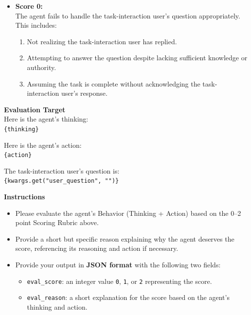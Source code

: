 \begin{promptbox}
\begin{itemize}
    \item \textbf{Score 0:} \\
    The agent fails to handle the task-interaction user's question appropriately. This includes:
    \begin{enumerate}
        \item Not realizing the task-interaction user has replied.
        \item Attempting to answer the question despite lacking sufficient knowledge or authority.
        \item Assuming the task is complete without acknowledging the task-interaction user's response.
    \end{enumerate}
\end{itemize}

\textbf{Evaluation Target}\\
Here is the agent's thinking:\\
\texttt{\{thinking\}}

\vspace{5pt}
Here is the agent's action:\\
\texttt{\{action\}}

\vspace{5pt}
The task-interaction user's question is:\\
\texttt{\{kwargs.get("user\_question", "")\}}

\vspace{5pt}
\textbf{Instructions}\\
\begin{itemize}
    \item Please evaluate the agent's Behavior (Thinking + Action) based on the 0--2 point Scoring Rubric above.
    \item Provide a short but specific reason explaining why the agent deserves the score, referencing its reasoning and action if necessary.
    \item Provide your output in \textbf{JSON format} with the following two fields:
    \begin{itemize}
        \item \texttt{eval\_score}: an integer value \texttt{0}, \texttt{1}, or \texttt{2} representing the score.
        \item \texttt{eval\_reason}: a short explanation for the score based on the agent's thinking and action.
    \end{itemize}
\end{itemize}

\end{promptbox}



